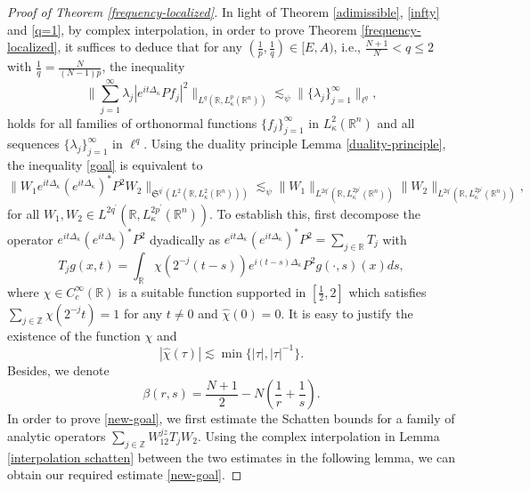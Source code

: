\documentclass[a4paper,11pt, reqno]{amsart}
\numberwithin{equation}{section}
\theoremstyle{plain}
\theoremstyle{definition}
\theoremstyle{remark}
\begin{document}
\begin{proof}[Proof of Theorem \ref{frequency-localized}]
In light of Theorem \ref{adimissible}, \eqref{infty} and \eqref{q=1}, by complex interpolation, in order to prove Theorem \ref{frequency-localized}, it suffices to deduce that for any $(\frac{1}{p},\frac{1}{q})\in [E,A)$, i.e., $\frac{N+1}{N}<q\leq 2$  with $\frac{1}{q}=\frac{N}{(N-1)p}$, the inequality
\begin{equation}\label{goal}
			\bigg\|\sum_{j=1}^\infty \lambda_j|e^{it\Delta_\kappa}Pf_j|^2\bigg\|_{L^q(\mathbb{R}, L_\kappa^p(\mathbb{R}^n))}\lesssim_\psi \|\{\lambda_j\}^\infty_{j=1}\|_{\ell^q}, 
\end{equation}	
holds for all families of orthonormal functions $\{f_j\}_{j=1}^\infty$ in $L_\kappa^2(\mathbb{R}^n)$ and all sequences $\{\lambda_j\}^\infty_{j=1}$ in $\ell^q$. Using the duality principle Lemma \ref{duality-principle},  the inequality \eqref{goal} is equivalent to
\begin{equation}\label{new-goal}
	\big\|W_1e^{it\Delta_\kappa}(e^{it\Delta_\kappa})^*P^2W_2\big\|_{\mathfrak{S}^{q^\prime}(L^2(\mathbb{R}, L_\kappa^2(\mathbb{R}^n)))}\lesssim_\psi \big\|W_1\big\|_{L^{2q^\prime}(\mathbb{R}, L_\kappa^{2p^\prime}(\mathbb{R}^n))} \big\|W_2\big\|_{L^{2q^\prime}(\mathbb{R}, L_\kappa^{2p^\prime}(\mathbb{R}^n))},
		\end{equation}
  for all $W_1,W_2\in L^{2q^\prime}(\mathbb{R}, L_\kappa^{2p^\prime}(\mathbb{R}^n))$.
To establish this, first decompose the operator $e^{it\Delta_\kappa}(e^{it\Delta_\kappa})^*P^2$ dyadically as  $e^{it\Delta_\kappa}(e^{it\Delta_\kappa})^*P^2=\sum\limits_{j\in\mathbb{R}}T_j$ with
\begin{equation*}
    T_jg(x,t)=\int_\mathbb{R} \chi\left(2^{-j}(t-s)\right)e^{i(t-s)\Delta_\kappa}P^2g(\cdot,s)(x)ds,
\end{equation*}
where $\chi\in C^\infty_c(\mathbb{R})$ is a suitable function supported in $[\frac{1}{2},2]$ which satisfies $\sum\limits_{j\in\mathbb{Z}}\chi\left(2^{-j}t\right)=1$ for any $t\neq0$ and $\widehat{\chi}(0)=0$. It is easy to justify the existence of the function $\chi$ and 
\begin{equation}\label{chi}
  |\widehat{\chi}(\tau)|\lesssim\min\{|\tau|,|\tau|^{-1}\}.  
\end{equation}
Besides, we denote 
\begin{equation*}
\beta(r,s)=\frac{N+1}{2}-N\left(\frac{1}{r}+\frac{1}{s}\right).
\end{equation*}
In order to prove \eqref{new-goal}, we first estimate the Schatten bounds for a family of analytic operators $\sum\limits_{j\in\mathbb{Z}} W_12^{jz}T_j W_2$. Using the complex interpolation in Lemma \ref{interpolation schatten} between the two estimates in the following lemma, we  can obtain  our required estimate \eqref{new-goal}.               \end{proof}
\end{document}
